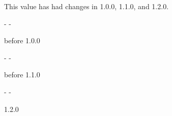\medbreak
\label{module-Ocamlary-val-changing}\begin{ocamlindent}This value has had changes in 1.0.0, 1.1.0, and 1.2.0.\begin{description}\kern-\topsep
\makeatletter\advance\@topsepadd-\topsep\makeatother%
\item[{before 1.\allowbreak{}0.\allowbreak{}0}]{before 1.0.0}\end{description}%
\begin{description}\kern-\topsep
\makeatletter\advance\@topsepadd-\topsep\makeatother%
\item[{before 1.\allowbreak{}1.\allowbreak{}0}]{before 1.1.0}\end{description}%
\begin{description}\kern-\topsep
\makeatletter\advance\@topsepadd-\topsep\makeatother%
\item[{version}]{1.2.0}\end{description}%
\end{ocamlindent}%
\medbreak
